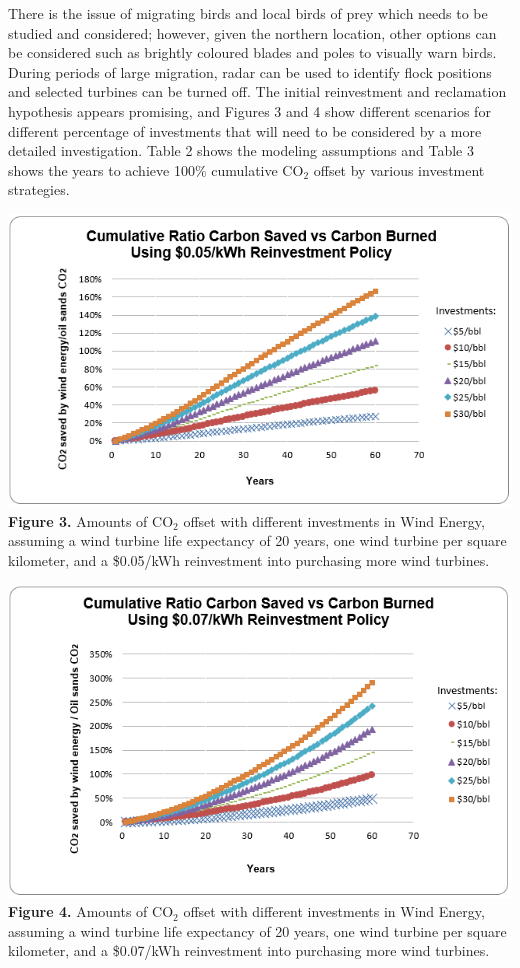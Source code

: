 \documentclass[11pt]{article}
\begin{document}
There is the issue of migrating birds and local birds of prey which needs to be studied and considered; however, given the northern location, other options can be considered such as brightly coloured blades and poles to visually warn birds.  During periods of large migration, radar can be used to identify flock positions and selected turbines can be turned off.
The initial reinvestment and reclamation hypothesis appears promising, and Figures 3 and 4 show different scenarios for different percentage of investments that will need to be considered by a more detailed investigation.  Table 2 shows the modeling assumptions and Table 3 shows the years to achieve 100\% cumulative CO$_2$ offset by various investment strategies.

\begin{center}
\includegraphics{g3.png}
{\bf Figure 3.} Amounts of CO$_2$ offset with different investments in Wind Energy, assuming a wind turbine life expectancy of 20 years, one wind turbine per square kilometer, and a \$0.05/kWh reinvestment into purchasing more wind turbines. 
\end{center}

\begin{center}
\includegraphics{g4.png}
{\bf Figure 4.} Amounts of CO$_2$ offset with different investments in Wind Energy, assuming a wind turbine life expectancy of 20 years, one wind turbine per square kilometer, and a \$0.07/kWh reinvestment into purchasing more wind turbines. 
\end{center}
\end{document}
